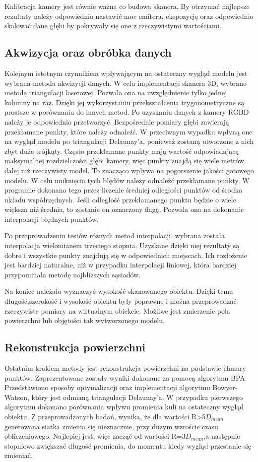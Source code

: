 Kalibracja kamery jest równie ważna co budowa skanera. By otrzymać najlepsze rezultaty należy odpowiednio nastawić moc emitera, ekspozycję oraz odpowiednio skalować dane głębi by pokrywały się one z rzeczywistymi wartościami. 
\subsection{Akwizycja oraz obróbka danych}
Kolejnym istotnym czynnikiem wpływającym na ostateczny wygląd modelu jest wybrana metoda akwizycji danych. W celu implementacji skanera 3D, wybrano metodę triangulacji laserowej. Pozwala ona na uwzględnienie tylko jednej kolumny na raz. Dzięki jej wykorzystaniu przekształcenia trygonometryczne są prostsze w porównaniu do innych metod. Po uzyskaniu danych z kamery RGBD należy je odpowiednio przetworzyć. Bezpośrednie pomiary głębi zawierają przekłamane punkty, które należy odnaleźć. W przeciwnym wypadku wpłyną one na wygląd modelu po triangulacji Delaunay'a, ponieważ zostaną utworzone z nich zbyt duże trójkąty. Często przekłamane punkty mają wartość odpowiadającą maksymalnej rozdzielczości głębi kamery, więc punkty znajdą się wiele metrów dalej niż rzeczywisty model. To znacząco wpływa na pogorszenie jakości gotowego modelu. W celu uniknięcia tych błędów należy odnaleźć przekłamane punkty. W programie dokonano tego przez liczenie średniej odległości punktów od środka układu współrzędnych. Jeśli odległość przekłamanego punktu będzie o wiele większa niż średnia, to zostanie on oznaczony flagą. Pozwala ona na dokonanie interpolacji błędnych punktów. 

Po przeprowadzeniu testów różnych metod interpolacji, wybrana została interpolacja wielomianem trzeciego stopnia. Uzyskane dzięki niej rezultaty są dobre i wszystkie punkty znajdują się w odpowiednich miejscach. Ich rozłożenie jest bardziej naturalne, niż w przypadku interpolacji liniowej, która bardziej przypominała metodę najbliższych sąsiadów.

Na koniec należało wyznaczyć wysokość skanowanego obiektu. Dzięki temu długość,szerokość i wysokość obiektu były poprawne i można przeprowadzać rzeczywiste pomiary na wirtualnym obiekcie. Możliwe jest zmierzenie pola powierzchni lub objętości tak wytworzonego modelu. 
\subsection{Rekonstrukcja powierzchni}
Ostatnim krokiem metody jest rekonstrukcja powierzchni na podstawie chmury punktów. Zaprezentowane zostały wyniki dokonane za pomocą algorytmu BPA. Przedstawiono sposoby optymalizacji oraz implementacji algorytmu Bowyer-Watson, który jest odmianą triangulacji Delaunay'a. W przypadku pierwszego algorytmu dokonano porównania wpływu promienia kuli na ostateczny wygląd obiektu. Z przeprowadzonych badań, wynika, że dla wartości R>5$D_{mean}$ generowana siatka zmienia się nieznacznie, przy dużym wzroście czasu obliczeniowego. Najlepiej jest, więc zacząć od wartości R=3$D_{mean}$,a następnie stopniowo zwiększać długość promienia, do momentu kiedy wygląd przestanie się zmieniać.

